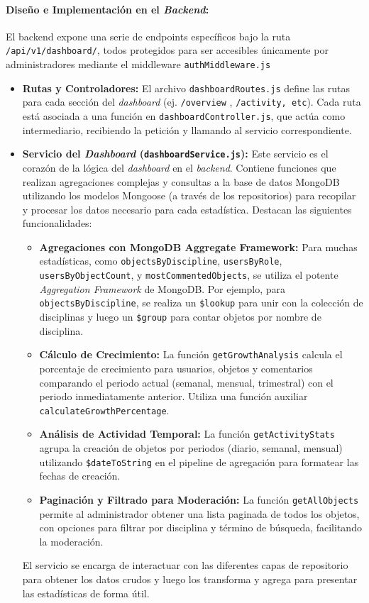 \paragraph{Diseño e Implementación en el \textit{Backend}:}El backend expone una serie de endpoints específicos bajo la ruta \texttt{/api/v1/dashboard/}, todos protegidos para ser accesibles únicamente por administradores mediante el middleware \texttt{authMiddleware.js}
\begin{itemize}
    \item \textbf{Rutas y Controladores:} El archivo \texttt{dashboardRoutes.js} define las rutas para cada sección del \textit{dashboard} (ej. \texttt{/overview} , \texttt{/activity, etc}). Cada ruta está asociada a una función en \texttt{dashboardController.js}, que actúa como intermediario, recibiendo la petición y llamando al servicio correspondiente.
    \item \textbf{Servicio del \textit{Dashboard} (\texttt{dashboardService.js}):} Este servicio es el corazón de la lógica del \textit{dashboard} en el \textit{backend}. Contiene funciones que realizan agregaciones complejas y consultas a la base de datos MongoDB utilizando los modelos Mongoose (a través de los repositorios) para recopilar y procesar los datos necesario para cada estadística. Destacan las siguientes funcionalidades:
    \begin{itemize}
        \item \textbf{Agregaciones con MongoDB Aggregate Framework:} Para muchas estadísticas, como \texttt{objectsByDiscipline}, \texttt{usersByRole}, \texttt{usersByObjectCount}, y \texttt{mostCommentedObjects}, se utiliza el potente \textit{Aggregation Framework} de MongoDB. Por ejemplo, para \texttt{objectsByDiscipline}, se realiza un \texttt{\$lookup} para unir con la colección de disciplinas y luego un \texttt{\$group} para contar objetos por nombre de disciplina.
        \item \textbf{Cálculo de Crecimiento:} La función \texttt{getGrowthAnalysis} calcula el porcentaje de crecimiento para usuarios, objetos y comentarios comparando el periodo actual (semanal, mensual, trimestral) con el periodo inmediatamente anterior. Utiliza una función auxiliar \texttt{calculateGrowthPercentage}.
        \item \textbf{Análisis de Actividad Temporal:} La función \texttt{getActivityStats} agrupa la creación de objetos por periodos (diario, semanal, mensual) utilizando \texttt{\$dateToString} en el pipeline de agregación para formatear las fechas de creación.
        \item \textbf{Paginación y Filtrado para Moderación:} La función \texttt{getAllObjects} permite al administrador obtener una lista paginada de todos los objetos, con opciones para filtrar por disciplina y término de búsqueda, facilitando la moderación.
    \end{itemize}
    El servicio se encarga de interactuar con las diferentes capas de repositorio para obtener los datos crudos y luego los transforma y agrega para presentar las estadísticas de forma útil.
\end{itemize}

